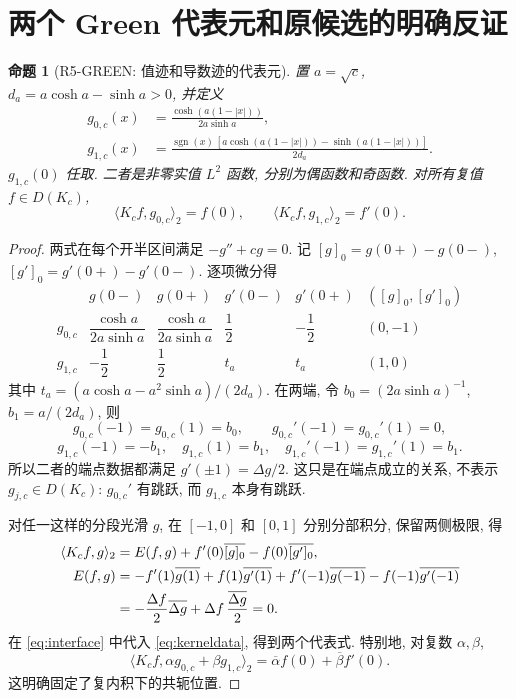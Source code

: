 \documentclass[UTF8,fontset=fandol,11pt,a4paper]{ctexart}
\newtheorem{proposition}[theorem]{命题}
\theoremstyle{definition}
\newcommand{\sgn}{\operatorname{sgn}}
\newcommand{\ip}[2]{\langle #1,#2\rangle_2}
\begin{document}
\section{两个 Green 代表元和原候选的明确反证}
\label{sec:refute}

\begin{proposition}[R5-GREEN: 值迹和导数迹的代表元]\label{prop:green}
置 $a=\sqrt c$, $d_a=a\cosh a-\sinh a>0$, 并定义
\begin{align}
g_{0,c}(x)&=\frac{\cosh(a(1-|x|))}{2a\sinh a},\label{eq:g0}\\
g_{1,c}(x)&=\frac{\sgn(x)\,[a\cosh(a(1-|x|))-\sinh(a(1-|x|))]}{2d_a}.
\label{eq:g1}
\end{align}
$g_{1,c}(0)$ 任取. 二者是非零实值 $L^2$ 函数, 分别为偶函数和奇函数.
对所有复值 $f\in D(K_c)$,
\begin{equation}\label{eq:representers}
\boxed{\ip{K_cf}{g_{0,c}}=f(0),\qquad
\ip{K_cf}{g_{1,c}}=f'(0).}
\end{equation}
\end{proposition}

\begin{proof}
两式在每个开半区间满足 $-g''+cg=0$.
记 $[g]_0=g(0+)-g(0-)$, $[g']_0=g'(0+)-g'(0-)$.
逐项微分得
\begin{equation}\label{eq:kerneldata}
\begin{array}{c|ccccc}
&g(0-)&g(0+)&g'(0-)&g'(0+)&([g]_0,[g']_0)\\ \hline
g_{0,c}&\dfrac{\cosh a}{2a\sinh a}&\dfrac{\cosh a}{2a\sinh a}
&\dfrac12&-\dfrac12&(0,-1)\\[6pt]
g_{1,c}&-\dfrac12&\dfrac12&t_a&t_a&(1,0)
\end{array}
\end{equation}
其中 $t_a=(a\cosh a-a^2\sinh a)/(2d_a)$.
在两端, 令 $b_0=(2a\sinh a)^{-1}$, $b_1=a/(2d_a)$, 则
\[
g_{0,c}(-1)=g_{0,c}(1)=b_0,\qquad g_{0,c}'(-1)=g_{0,c}'(1)=0,
\]
\[
g_{1,c}(-1)=-b_1,\quad g_{1,c}(1)=b_1,\quad
g_{1,c}'(-1)=g_{1,c}'(1)=b_1.
\]
所以二者的端点数据都满足 $g'(\pm1)=\Delta g/2$.
这只是在端点成立的关系, 不表示 $g_{j,c}\in D(K_c)$:
$g_{0,c}'$ 有跳跃, 而 $g_{1,c}$ 本身有跳跃.

对任一这样的分段光滑 $g$, 在 $[-1,0]$ 和 $[0,1]$ 分别分部积分,
保留两侧极限, 得
\begin{align}
\ip{K_cf}{g}
&=E(f,g)+f'(0)\overline{[g]_0}-f(0)\overline{[g']_0},\label{eq:interface}\\
E(f,g)&=-f'(1)\overline{g(1)}+f(1)\overline{g'(1)}
 +f'(-1)\overline{g(-1)}-f(-1)\overline{g'(-1)}\notag\\
&=-\frac{\Delta f}{2}\overline{\Delta g}
 +\Delta f\,\frac{\overline{\Delta g}}2=0.\notag
\end{align}
在 \eqref{eq:interface} 中代入 \eqref{eq:kerneldata}, 得到两个代表式.
特别地, 对复数 $\alpha,\beta$,
\begin{equation}\label{eq:complexrep}
\ip{K_cf}{\alpha g_{0,c}+\beta g_{1,c}}
=\overline\alpha f(0)+\overline\beta f'(0).
\end{equation}
这明确固定了复内积下的共轭位置.
\end{proof}
\end{document}
